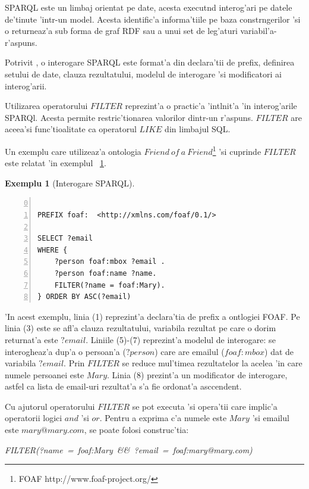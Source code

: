 \documentclass[12pt,a4paper,twoside]{report}
\newtheorem{example}{Exemplu}
\begin{document}
SPARQL este un limbaj orientat pe date, acesta execut\ia nd interog'ari pe datele de'tinute 'intr-un model. Acesta identific'a informa'tiile pe baza constr\ia ngerilor 'si o returneaz'a sub forma de graf RDF sau a unui set de leg'aturi variabil'a-r'aspuns.

Potrivit \cite{sparql_tutorial}, o interogare SPARQL este format'a din declara'tii de prefix, definirea setului de date, clauza rezultatului, modelul de interogare 'si modificatori ai interog'arii.

Utilizarea operatorului $FILTER$ reprezint'a o practic'a 'int\ia lnit'a 'in interog'arile SPARQl. Acesta permite restric'tionarea valorilor dintr-un r'aspuns. $FILTER$ are aceea'si func'tioalitate ca operatorul $LIKE$ din limbajul SQL. 

Un exemplu care utilizeaz'a ontologia $Friend\ of\ a\ Friend$\footnote{FOAF http://www.foaf-project.org/} 'si cuprinde $FILTER$ este relatat 'in exemplul ~\ref{ex:sparql_ex}.



\begin{example}[Interogare SPARQL]
\begin{lstlisting}[basicstyle=\footnotesize, numbers=left, firstnumber = 0]

PREFIX foaf:  <http://xmlns.com/foaf/0.1/>

SELECT ?email
WHERE {
    ?person foaf:mbox ?email .
    ?person foaf:name ?name.
    FILTER(?name = foaf:Mary).
} ORDER BY ASC(?email)
\end{lstlisting}
\label{ex:sparql_ex}
\end{example}

'In acest exemplu, linia (1) reprezint'a declara'tia de prefix a ontlogiei FOAF. Pe linia (3) este se afl'a clauza rezultatului, variabila rezultat pe care o dorim returnat'a este $?email$. Liniile (5)-(7) reprezint'a modelul de interogare: se interogheaz'a dup'a o persoan'a ($?person$) care are emailul ($foaf:mbox$) dat de variabila $?email$. Prin $FILTER$ se reduce mul'timea rezultatelor la acelea 'in care numele persoanei este $Mary$. Linia (8) prezint'a un modificator de interogare, astfel ca lista de email-uri rezultat'a s'a fie ordonat'a asccendent.

Cu ajutorul operatorului $FILTER$ se pot executa 'si opera'tii care implic'a operatorii logici $and$ 'si $or$. Pentru a exprima c'a numele este $Mary$ 'si emailul este $mary@mary.com$, se poate folosi construc'tia: 
\begin{center}
{\it FILTER(?name\ =\ foaf:Mary\ \&\&\ ?email\ =\ foaf:mary@mary.com)}
\end{center}
\end{document}
